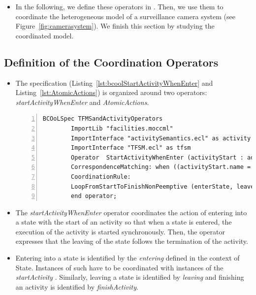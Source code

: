 \begin{itemize}
		\item In the following, we define these operators in \bcool. Then, we use them to coordinate the heterogeneous model of a surveillance camera system (see Figure~\ref{fig:camerasystem}). We finish this section by studying the coordinated model.  


	\end{itemize}
	
	
	\subsection{Definition of the Coordination Operators}
	\begin{itemize}
		\item The \bcool specification (Listing~\ref{lst:bcoolStartActivityWhenEnter} and Listing~\ref{lst:AtomicActions}) is organized around two operators: \emph{startActivityWhenEnter} and \emph{AtomicActions}. 
		
		\begin{lstlisting}[language=bcool,
		caption={Hierarchical operator between TFSM and fUML languages},
		label={lst:bcoolStartActivityWhenEnter}, 
		basicstyle=\scriptsize\ttfamily, backgroundcolor=\color{LGrey}, numbers=left, xleftmargin=2pt]
		BCOoLSpec TFMSandActivityOperators
		ImportLib "facilities.moccml"
		ImportInterface "activitySemantics.ecl" as activity
		ImportInterface "TFSM.ecl" as tfsm
		Operator  StartActivityWhenEnter (activityStart : ad::startActivity , activityStop : ad::finishActivity, enterState : tfsm::entering, leaveState : tfsm::leaving)
		CorrespondenceMatching: when ((activityStart.name = activityStop.name ) and (enterState.name = leaveState.name) and (activityStart.name = enterState.onEnterAction.name));
		CoordinationRule: 
		LoopFromStartToFinishNonPeemptive (enterState, leaveState, activityStart, activityStop)
		end operator;
		\end{lstlisting}
		
		
		\item The \emph{startActivityWhenEnter} operator coordinates the action of entering into a state with the start of an activity so that when a state is entered, the execution of the activity is started synchronously. Then, the operator expresses that the leaving of the state follows the termination of the activity.   
		
		 \item Entering into a state is identified by the \textit{entering} \dse defined in the context of State. Instances of such \dse have to be coordinated with instances of the \textit{startActivity} \dse. Similarly, leaving a state is identified by \dse \textit{leaving} and finishing an activity is identified by \dse \textit{finishActivity}. 
		 

\end{itemize}
